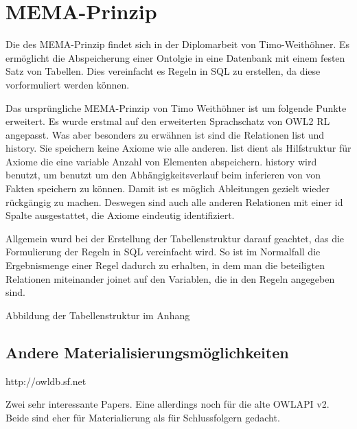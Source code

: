 \section{MEMA-Prinzip}
Die des MEMA-Prinzip findet sich in der Diplomarbeit von Timo-Weithöhner. Es ermöglicht die Abspeicherung einer Ontolgie in eine Datenbank mit einem festen Satz von Tabellen. Dies vereinfacht es Regeln in SQL zu erstellen, da diese vorformuliert werden können.

Das ursprüngliche MEMA-Prinzip von Timo Weithöhner ist um folgende Punkte erweitert.
Es wurde erstmal auf den erweiterten Sprachschatz von OWL2 RL angepasst. Was aber besonders zu erwähnen ist sind die Relationen list und history. Sie speichern keine Axiome wie alle anderen. list dient als Hilfstruktur für Axiome die eine variable Anzahl von Elementen abspeichern. history wird benutzt, um benutzt um den Abhängigkeitsverlauf beim inferieren von von Fakten speichern zu können. Damit ist es möglich Ableitungen gezielt wieder rückgängig zu machen. Deswegen sind auch alle anderen Relationen mit einer id Spalte ausgestattet, die Axiome eindeutig identifiziert.

Allgemein wurd bei der Erstellung der Tabellenstruktur darauf geachtet, das die Formulierung der Regeln in SQL vereinfacht wird. So ist im Normalfall die Ergebnismenge einer Regel dadurch zu erhalten, in dem man die beteiligten Relationen miteinander joinet auf den Variablen, die in den Regeln angegeben sind.

Abbildung der Tabellenstruktur im Anhang


\subsection{Andere Materialisierungsmöglichkeiten}
http://owldb.sf.net

Zwei sehr interessante Papers. Eine allerdings noch für die alte OWLAPI v2. Beide sind eher für Materialierung als für Schlussfolgern gedacht.